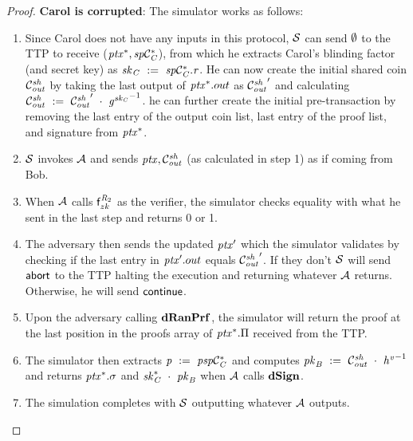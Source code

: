 \begin{proof}
    \textbf{Carol is corrupted}: The simulator works as follows:
    \begin{enumerate}
        \item Since Carol does not have any inputs in this protocol, $\mathcal{S}$ can send $\emptyset$ to the TTP to receive ($\mathit{ptx}^*, \mathit{sp}\mathcal{C}_{\mathit{C}}^*$), from which he extracts Carol's blinding factor (and secret key) as $\mathit{sk}_{\mathit{C}} ~:=~ \mathit{sp}\mathcal{C}_{\mathit{C}}^*.\mathit{r}$.
        He can now create the initial shared coin $\mathcal{C}_{\mathit{out}}^{\mathit{sh}}$ by taking the last output of $\mathit{ptx}^*.out$ as ${\mathcal{C}_{\mathit{out}}^{\mathit{sh}}}'$ and calculating $\mathcal{C}_{\mathit{out}}^{\mathit{sh}} ~:=~ {\mathcal{C}_{\mathit{out}}^{\mathit{sh}}}' ~\cdot~ {\mathit{g}^{\mathit{sk}_{\mathit{C}}}}^{-1}$.
        he can further create the initial pre-transaction by removing the last entry of the output coin list, last entry of the proof list, and signature from $\mathit{ptx}^*$.
        \item $\mathcal{S}$ invokes $\mathcal{A}$ and sends $\mathit{ptx}, \mathcal{C}_{\mathit{out}}^{\mathit{sh}}$ (as calculated in step 1) as if coming from Bob.
        \item When $\mathcal{A}$ calls $\mathsf{f}^{\mathit{R}_2}_{zk}$ as the verifier, the simulator checks equality with what he sent in the last step and returns 0 or 1.
        \item The adversary then sends the updated ${\mathit{ptx}}'$ which the simulator validates by checking if the last entry in ${\mathit{ptx}}'.out$ equals ${\mathcal{C}_{\mathit{out}}^{\mathit{sh}}}'$.
        If they don't $\mathcal{S}$ will send $\mathsf{abort}$ to the TTP halting the execution and returning whatever $\mathcal{A}$ returns.
        Otherwise, he will send $\mathsf{continue}$.
        \item Upon the adversary calling $\mathbf{dRanPrf}$, the simulator will return the proof at the last position in the proofs array of $\mathit{ptx}^*.\Pi$ received from the TTP.
        \item The simulator then extracts $\mathit{p} ~:=~ \mathit{psp}\mathcal{C}_{\mathit{C}}^*$ and computes $\mathit{pk}_{\mathit{B}} ~:=~ \mathcal{C}_{\mathit{out}}^{\mathit{sh}} ~\cdot~ {\mathit{h}^{\mathit{v}}}^{-1}$ and returns $\mathit{ptx}^*.\sigma$ and $\mathit{sk}_{\mathit{C}}^* ~\cdot~ \mathit{pk}_{\mathit{B}}$ when $\mathcal{A}$ calls $\mathbf{dSign}$.
        \item The simulation completes with $\mathcal{S}$ outputting whatever $\mathcal{A}$ outputs.
    \end{enumerate}


\end{proof}
